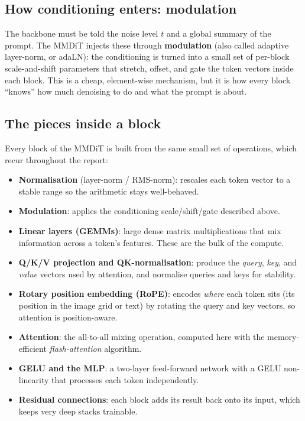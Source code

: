 \documentclass[11pt]{report}
\begin{document}
\subsection{How conditioning enters: modulation}

The backbone must be told the noise level $t$ and a global summary of the
prompt. The MMDiT injects these through \textbf{modulation} (also called
adaptive layer-norm, or adaLN): the conditioning is turned into a small
set of per-block scale-and-shift parameters that stretch, offset, and gate
the token vectors inside each block. This is a cheap, element-wise
mechanism, but it is how every block ``knows'' how much denoising to do
and what the prompt is about.

\subsection{The pieces inside a block}

Every block of the MMDiT is built from the same small set of operations,
which recur throughout the report:

\begin{itemize}
\item \textbf{Normalisation} (layer-norm / RMS-norm): rescales each token
vector to a stable range so the arithmetic stays well-behaved.
\item \textbf{Modulation}: applies the conditioning scale/shift/gate
described above.
\item \textbf{Linear layers (GEMMs)}: large dense matrix multiplications
that mix information across a token's features. These are the bulk of the
compute.
\item \textbf{Q/K/V projection and QK-normalisation}: produce the
\emph{query}, \emph{key}, and \emph{value} vectors used by attention, and
normalise queries and keys for stability.
\item \textbf{Rotary position embedding (RoPE)}: encodes \emph{where} each
token sits (its position in the image grid or text) by rotating the query
and key vectors, so attention is position-aware.
\item \textbf{Attention}: the all-to-all mixing operation, computed here
with the memory-efficient \emph{flash-attention} algorithm.
\item \textbf{GELU and the MLP}: a two-layer feed-forward network with a
GELU non-linearity that processes each token independently.
\item \textbf{Residual connections}: each block adds its result back onto
its input, which keeps very deep stacks trainable.
\end{itemize}
\end{document}

